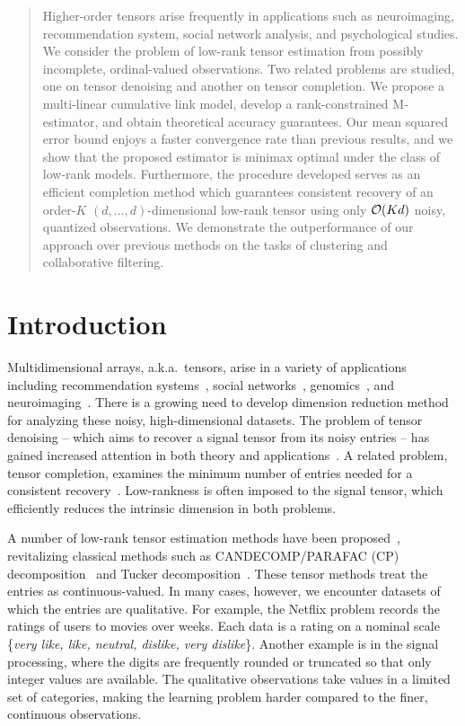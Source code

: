 \documentclass{article}
\theoremstyle{plain}
\theoremstyle{definition}
\begin{document}
\begin{abstract}
Higher-order tensors arise frequently in applications such as neuroimaging, recommendation system, social network analysis, and psychological studies. We consider the problem of low-rank tensor estimation from possibly incomplete, ordinal-valued observations. Two related problems are studied, one on tensor denoising and another on tensor completion. We propose a multi-linear cumulative link model, develop a rank-constrained M-estimator, and obtain theoretical accuracy guarantees. Our mean squared error bound enjoys a faster convergence rate than previous results, and we show that the proposed estimator is minimax optimal under the class of low-rank models. Furthermore, the procedure developed serves as an efficient completion method which guarantees consistent recovery of an order-$K$ $(d,\ldots,d)$-dimensional low-rank tensor using only $\mathcal{O}(Kd)$ noisy, quantized observations. We demonstrate the outperformance of our approach over previous methods on the tasks of clustering and collaborative filtering. 

\end{abstract}


\section{Introduction}
Multidimensional arrays, a.k.a.\ tensors, arise in a variety of applications including recommendation systems~\citep{adomavicius2011context}, social networks~\citep{nickel2011three}, genomics~\citep{wang2017three}, and neuroimaging~\citep{zhou2013tensor}. There is a growing need to develop dimension reduction method for analyzing these noisy, high-dimensional datasets. The problem of tensor denoising -- which aims to recover a signal tensor from its noisy entries -- has gained increased attention in both theory and applications~\citep{xia2019sup,xie2016multispectral}. A related problem, tensor completion, examines the minimum number of entries needed for a consistent recovery~\citep{ghadermarzy2018learning,ghadermarzy2019near}. Low-rankness is often imposed to the signal tensor, which efficiently reduces the intrinsic dimension in both problems. 

A number of low-rank tensor estimation methods have been proposed~\citep{kolda2009tensor,acar2010scalable}, revitalizing classical methods such as CANDECOMP/PARAFAC (CP) decomposition~\citep{hitchcock1927expression} and Tucker decomposition~\citep{tucker1966some}. These tensor methods treat the entries as continuous-valued. In many cases, however, we encounter datasets of which the entries are qualitative. For example, the Netflix problem records the ratings of users to movies over weeks. Each data is a rating on a nominal scale \{{\it very like, like, neutral, dislike, very dislike}\}. Another example is in the signal processing, where the digits are frequently rounded or truncated so that only integer values are available. The qualitative observations take values in a limited set of categories, making the learning problem harder compared to the finer, continuous observations. 
\end{document}
